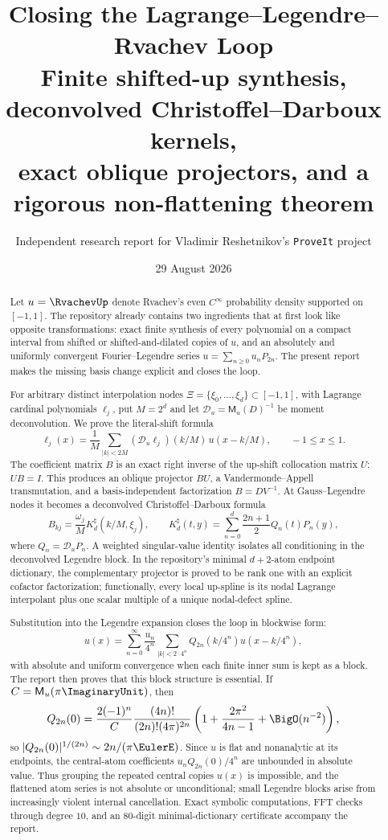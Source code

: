 \documentclass[11pt]{article}
\title{\bfseries Closing the Lagrange--Legendre--Rvachev Loop\\[0.45em]
\large Finite shifted-up synthesis, deconvolved Christoffel--Darboux kernels,\\
exact oblique projectors, and a rigorous non-flattening theorem}
\author{Independent research report for Vladimir Reshetnikov's \texttt{ProveIt} project}
\date{29 August 2026}
\theoremstyle{definition}
\theoremstyle{remark}
\newcommand{\MM}{\mathsf M}
\newcommand{\Dscr}{\mathscr D_{u}}
\begin{document}
\maketitle

\begin{abstract}
Let $u=\RvachevUp$ denote Rvachev's even $C^\infty$ probability density supported on
$[-1,1]$.  The repository already contains two ingredients that at first look
like opposite transformations: exact finite synthesis of every polynomial on a
compact interval from shifted or shifted-and-dilated copies of $u$, and an
absolutely and uniformly convergent Fourier--Legendre series
$u=\sum_{n\ge0}u_nP_{2n}$.  The present report makes the missing basis change
explicit and closes the loop.

For arbitrary distinct interpolation nodes $\Xi=\{\xi_0,\ldots,\xi_d\}\subset
[-1,1]$, with Lagrange cardinal polynomials $\ell_j$, put $M=2^d$ and let
$\Dscr=\MM_u(D)^{-1}$ be moment deconvolution.  We prove the literal-shift
formula
\[
 \ell_j(x)=\frac1M\sum_{|k|<2M}(\Dscr\ell_j)(k/M)\,u(x-k/M),
 \qquad -1\le x\le1.
\]
The coefficient matrix $B$ is an exact right inverse of the up-shift
collocation matrix $U$: $UB=I$.  This produces an oblique projector $BU$, a
Vandermonde--Appell transmutation, and a basis-independent factorization
$B=DV^{-1}$.  At Gauss--Legendre nodes it becomes a deconvolved
Christoffel--Darboux formula
\[
 B_{kj}=\frac{\omega_j}{M}K_d^\sharp(k/M,\xi_j),
 \qquad
 K_d^\sharp(t,y)=\sum_{n=0}^d\frac{2n+1}{2}Q_n(t)P_n(y),
\]
where $Q_n=\Dscr P_n$.  A weighted singular-value identity isolates all
conditioning in the deconvolved Legendre block.  In the repository's minimal
$d+2$-atom endpoint dictionary, the complementary projector is proved to be
rank one with an explicit cofactor factorization; functionally, every local
up-spline is its nodal Lagrange interpolant plus one scalar multiple of a unique
nodal-defect spline.

Substitution into the Legendre expansion closes the loop in blockwise form:
\[
 u(x)=\sum_{n=0}^\infty\frac{u_n}{4^n}
 \sum_{|k|<2\cdot4^n}Q_{2n}(k/4^n)u(x-k/4^n),
\]
with absolute and uniform convergence when each finite inner sum is kept as a
block.  The report then proves that this block structure is essential.  If
$C=\MM_u(\pi\ImaginaryUnit)$, then
\[
 Q_{2n}(0)=\frac{2(-1)^n}{C}\frac{(4n)!}{(2n)!(4\pi)^{2n}}
 \left(1+\frac{2\pi^2}{4n-1}+\BigO(n^{-2})\right),
\]
so $|Q_{2n}(0)|^{1/(2n)}\sim2n/(\pi\EulerE)$.  Since $u$ is flat and nonanalytic at
its endpoints, the central-atom coefficients $u_nQ_{2n}(0)/4^n$ are unbounded
in absolute value.  Thus grouping the repeated central copies $u(x)$ is
impossible, and the flattened atom series is not absolute or unconditional;
small Legendre blocks arise from increasingly violent internal cancellation.
Exact symbolic computations, FFT checks through degree $10$, and an 80-digit
minimal-dictionary certificate accompany the report.
\end{abstract}
\end{document}
